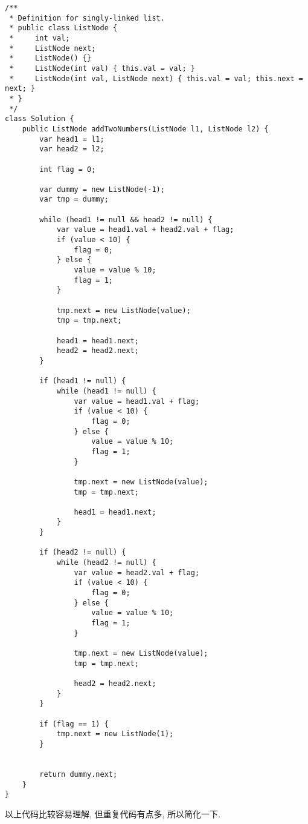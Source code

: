 \documentclass[oneside]{ctexbook}
\begin{document}
\begin{verbatim}
/**
 * Definition for singly-linked list.
 * public class ListNode {
 *     int val;
 *     ListNode next;
 *     ListNode() {}
 *     ListNode(int val) { this.val = val; }
 *     ListNode(int val, ListNode next) { this.val = val; this.next = next; }
 * }
 */
class Solution {
    public ListNode addTwoNumbers(ListNode l1, ListNode l2) {
        var head1 = l1;
        var head2 = l2;

        int flag = 0;

        var dummy = new ListNode(-1);
        var tmp = dummy;

        while (head1 != null && head2 != null) {
            var value = head1.val + head2.val + flag;
            if (value < 10) {
                flag = 0;
            } else {
                value = value % 10;
                flag = 1;
            }

            tmp.next = new ListNode(value);
            tmp = tmp.next;

            head1 = head1.next;
            head2 = head2.next;
        }

        if (head1 != null) {
            while (head1 != null) {
                var value = head1.val + flag;
                if (value < 10) {
                    flag = 0;
                } else {
                    value = value % 10;
                    flag = 1;
                }

                tmp.next = new ListNode(value);
                tmp = tmp.next;

                head1 = head1.next;
            }
        }

        if (head2 != null) {
            while (head2 != null) {
                var value = head2.val + flag;
                if (value < 10) {
                    flag = 0;
                } else {
                    value = value % 10;
                    flag = 1;
                }

                tmp.next = new ListNode(value);
                tmp = tmp.next;

                head2 = head2.next;
            }
        }

        if (flag == 1) {
            tmp.next = new ListNode(1);
        }


        return dummy.next;
    }
}
\end{verbatim}

以上代码比较容易理解, 但重复代码有点多, 所以简化一下.
\end{document}
